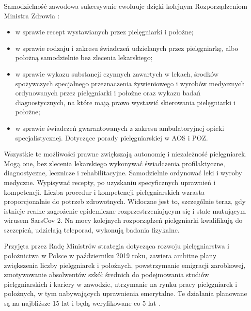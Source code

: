 \documentclass[a4paper,12pt,twoside,openright]{mwrep}
\begin{document}
Samodzielność zawodowa sukcesywnie ewoluuje dzięki kolejnym Rozporządzeniom Ministra Zdrowia \cite{akty}:
\begin{itemize}
	\item w sprawie recept wystawianych przez pielęgniarki i położne;
	\item w sprawie rodzaju i zakresu świadczeń udzielanych przez pielęgniarkę, albo położną samodzielnie bez zlecenia lekarskiego;
	\item w sprawie wykazu substancji czynnych zawartych w lekach, środków spożywczych specjalnego przeznaczenia żywieniowego i wyrobów medycznych ordynowanych przez pielęgniarki i położne oraz wykazu badań diagnostycznych, na które mają prawo wystawić skierowania pielęgniarki i położne;
	\item w sprawie świadczeń gwarantowanych z zakresu ambulatoryjnej opieki specjalistycznej. Dotyczące porady pielęgniarskiej w AOS i POZ.
\end{itemize}

Wszystkie te możliwości prawne zwiększają autonomię i niezależność pielęgniarek. Mogą one, bez zlecenia lekarskiego wykonywać świadczenia profilaktyczne, diagnostyczne, lecznicze i rehabilitacyjne. Samodzielnie ordynować leki i wyroby medyczne. Wypisywać recepty, po uzyskaniu specyficznych uprawnień i kompetencji. Liczba procedur i kompetencji pielęgniarskich wzrasta proporcjonalnie do potrzeb zdrowotnych. Widoczne jest to, szczególnie teraz, gdy istnieje realne zagrożenie epidemiczne rozprzestrzeniającym się i stale mutującym wirusem SarsCov 2. Na mocy kolejnych rozporządzeń pielęgniarki kwalifikują do szczepień, udzielają teleporad, wykonują badania fizykalne.

Przyjęta przez Radę Ministrów strategia dotycząca rozwoju pielęgniarstwa i położnictwa w Polsce   w październiku 2019 roku, zawiera ambitne plany zwiększenia liczby pielęgniarek i położnych, powstrzymanie emigracji zarobkowej, zmotywowanie absolwentów szkół średnich do podejmowania studiów pielęgniarskich i kariery w zawodzie, utrzymanie na rynku pracy pielęgniarek i położnych, w tym nabywających uprawnienia emerytalne. Te działania planowane są na najbliższe 15 lat i będą weryfikowane co 5 lat \cite{strategia}.
\end{document}
